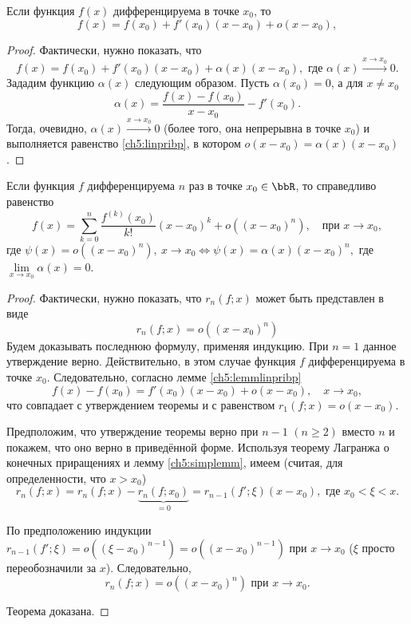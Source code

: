 \begin{lemm}\label{ch5:lemmlinpribp}
Если функция $f(x)$ дифференцируема в точке $x_0$, то
\begin{equation}\label{ch5:linpribp}
f(x) = f(x_0) + f'(x_0) (x-x_0) + o(x-x_0),
\end{equation}
\end{lemm}
\begin{proof}
Фактически, нужно показать, что
\begin{equation}\label{ch5:linpribp2}
f(x) = f(x_0) + f'(x_0) (x-x_0) + \alpha(x)(x-x_0), \text{ где } \alpha(x)\xrightarrow{x\to x_0} 0.
\end{equation}	
Зададим функцию $\alpha(x)$ следующим образом. Пусть $\alpha(x_0) = 0$, а для $x\ne x_0$ 
$$
\alpha(x) = \frac{f(x) - f(x_0)}{x-x_0} - f'(x_0). 
$$
Тогда, очевидно, $\alpha(x)\xrightarrow{x\to x_0} 0$ (более того, она непрерывна в точке $x_0$) и выполняется равенство \eqref{ch5:linpribp}, в котором $o(x-x_0) = \alpha(x)(x-x_0)$.
\end{proof}
\begin{thm}
Если функция $f$ дифференцируема $n$ раз в точке $x_0 \in \bbR$, то справедливо равенство
\begin{equation} \label{ch5:eq:Peano}
f(x) = \sum_{k = 0}^{n} \frac{f^{(k)}(x_0)}{k!} (x - x_0)^k + o((x - x_0)^n), \quad \text{при } x \to x_0,
\end{equation}
где $\psi(x) = o((x - x_0)^n),\ x \to x_0 \Longleftrightarrow \psi(x) = \alpha(x) (x - x_0)^n,$ где $\lim\limits_{x \to x_0} \alpha(x) = 0$.
\end{thm}
\begin{proof}
Фактически, нужно показать, что $r_n(f;x)$ может быть представлен в виде
$$
r_n(f;x) = o((x-x_0)^n)
$$
Будем доказывать последнюю формулу, применяя индукцию. При $n=1$ данное утверждение верно. Действительно, в этом случае функция $f$ дифференцируема в точке $x_0$. Следовательно, согласно лемме \ref{ch5:lemmlinpribp}
$$
f(x) - f(x_0) = f'(x_0) (x-x_0) + o(x-x_0),\quad x\to x_0,
$$
что совпадает с утверждением теоремы и с равенством $r_1(f;x)=o(x-x_0)$.

Предположим, что утверждение теоремы верно при $n-1$ $(n\ge 2)$ вместо $n$ и покажем, что оно верно в приведённой форме. Используя теорему Лагранжа о конечных приращениях и лемму \ref{ch5:simplemm}, имеем (считая, для определенности, что $x > x_0$)
$$
r_n(f;x) = r_n(f;x) - \underbrace{r_n(f;x_0)}_{=0} = r_{n-1} (f';\xi) (x-x_0), \text{ где } x_0<\xi<x.
$$

По предположению индукции $r_{n-1}(f'; \xi) = o((\xi-x_0)^{n-1}) = o((x-x_0)^{n-1})$ при $x\to x_0$ ($\xi$ просто переобозначили за $x$). Следовательно, 
$$
r_n(f;x) = o((x-x_0)^n) \text{ при } x\to x_0.
$$

Теорема доказана.
\end{proof}

